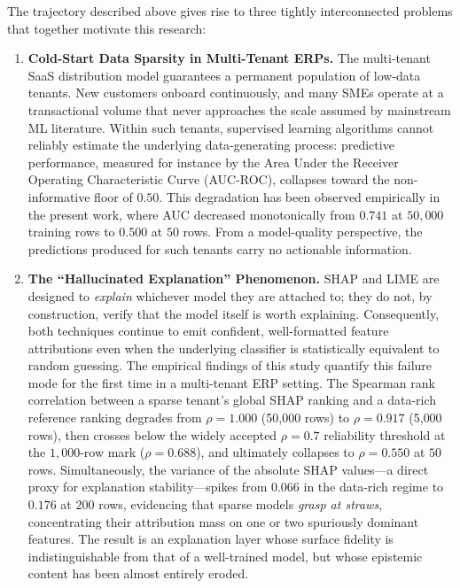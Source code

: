 The trajectory described above gives rise to three tightly interconnected problems that together motivate this research:

\begin{enumerate}[label=\arabic*.]
  \item \textbf{Cold-Start Data Sparsity in Multi-Tenant ERPs.}
  The multi-tenant SaaS distribution model guarantees a permanent population of low-data tenants. New customers onboard continuously, and many SMEs operate at a transactional volume that never approaches the scale assumed by mainstream ML literature. Within such tenants, supervised learning algorithms cannot reliably estimate the underlying data-generating process: predictive performance, measured for instance by the Area Under the Receiver Operating Characteristic Curve (AUC-ROC), collapses toward the non-informative floor of $0.50$. This degradation has been observed empirically in the present work, where AUC decreased monotonically from $0.741$ at $50{,}000$ training rows to $0.500$ at $50$ rows. From a model-quality perspective, the predictions produced for such tenants carry no actionable information.

  \item \textbf{The ``Hallucinated Explanation'' Phenomenon.}
  SHAP and LIME are designed to \emph{explain} whichever model they are attached to; they do not, by construction, verify that the model itself is worth explaining. Consequently, both techniques continue to emit confident, well-formatted feature attributions even when the underlying classifier is statistically equivalent to random guessing. The empirical findings of this study quantify this failure mode for the first time in a multi-tenant ERP setting. The Spearman rank correlation between a sparse tenant's global SHAP ranking and a data-rich reference ranking degrades from $\rho = 1.000$ (50{,}000 rows) to $\rho = 0.917$ (5{,}000 rows), then crosses below the widely accepted $\rho = 0.7$ reliability threshold at the $1{,}000$-row mark ($\rho = 0.688$), and ultimately collapses to $\rho = 0.550$ at $50$ rows. Simultaneously, the variance of the absolute SHAP values---a direct proxy for explanation stability---spikes from $0.066$ in the data-rich regime to $0.176$ at $200$ rows, evidencing that sparse models \emph{grasp at straws}, concentrating their attribution mass on one or two spuriously dominant features. The result is an explanation layer whose surface fidelity is indistinguishable from that of a well-trained model, but whose epistemic content has been almost entirely eroded.


\end{enumerate}
